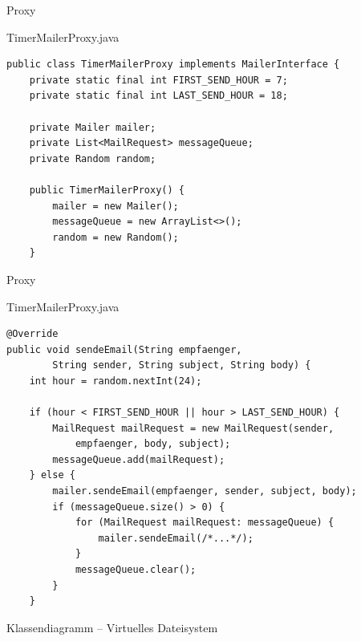 \begin{frame}[fragile]{Proxy}
	\begin{exampleblock}{TimerMailerProxy.java}
        \begin{lstlisting}
public class TimerMailerProxy implements MailerInterface {
	private static final int FIRST_SEND_HOUR = 7;
	private static final int LAST_SEND_HOUR = 18;
	
	private Mailer mailer;
	private List<MailRequest> messageQueue;
	private Random random;
	
	public TimerMailerProxy() {
		mailer = new Mailer();
		messageQueue = new ArrayList<>();
		random = new Random();
	}            
        \end{lstlisting}
 	\end{exampleblock}
\end{frame}

\begin{frame}[fragile]{Proxy}
	\begin{exampleblock}{TimerMailerProxy.java}
        \begin{lstlisting}
@Override
public void sendeEmail(String empfaenger, 
        String sender, String subject, String body) {
    int hour = random.nextInt(24);
    
    if (hour < FIRST_SEND_HOUR || hour > LAST_SEND_HOUR) {
        MailRequest mailRequest = new MailRequest(sender,
            empfaenger, body, subject);
        messageQueue.add(mailRequest);
    } else {
        mailer.sendeEmail(empfaenger, sender, subject, body);
        if (messageQueue.size() > 0) {
            for (MailRequest mailRequest: messageQueue) {
                mailer.sendeEmail(/*...*/);
            }
            messageQueue.clear();
        }
    } 
        \end{lstlisting}
 	\end{exampleblock}
\end{frame}

\begin{frame}{Klassendiagramm -- Virtuelles Dateisystem}
\end{frame}

